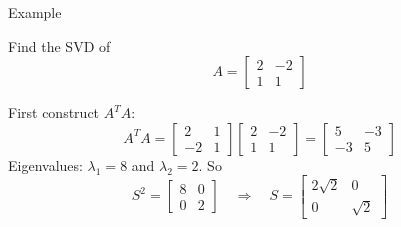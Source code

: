 \documentclass[10pt]{beamer}
\begin{document}
\begin{frame}{Example}
\begin{example}
Find the SVD of 
\[
A = \begin{bmatrix}2 & -2\\ 1 & 1\end{bmatrix}
\]
\end{example}
First construct $A^T A$:
\[
A^TA 
= 
\begin{bmatrix}2 & 1\\ -2 & 1\end{bmatrix}
\begin{bmatrix}2 & -2\\ 1 & 1\end{bmatrix}
=
\begin{bmatrix}
5 & -3\\ -3 & 5
\end{bmatrix}
\]
Eigenvalues: $\lambda_1 = 8$ and $\lambda_2 = 2$.  So
\[
S^2=
\begin{bmatrix}
8 & 0\\ 0 & 2
\end{bmatrix}
\quad
\Rightarrow
\quad
S=
\begin{bmatrix}
2\sqrt{2} & 0\\ 0 & \sqrt{2}
\end{bmatrix}
\]
\end{frame}
\end{document}
